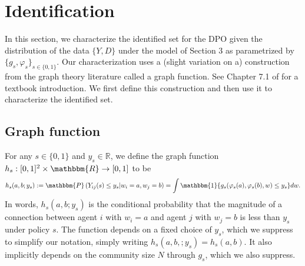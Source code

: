 \documentclass[12pt]{article}
\theoremstyle{definition}
\begin{document}


\section{Identification}
In this section, we characterize the identified set for the DPO given the distribution of the data $\{Y,D\}$ under the model of Section 3 as parametrized by $\{g_s,\varphi_s\}_{s \in \{0,1\}}$. Our characterization uses a (slight variation on a) construction from the graph theory literature called a graph function. See Chapter 7.1 of \cite{lovasz2012large} for a textbook introduction. We first define this construction and then use it to characterize the identified set. 

\subsection{Graph function}
For any $s \in \{0,1\}$ and $y_s \in \mathbb{R}$, we define the graph function $h_{s}: [0,1]^2\times \mathbbm{R} \to [0,1]$ to be
\begin{align*}
h_{s}(a,b; y_s) := \mathbbm{P}\left(Y_{ij}(s) \leq y_s| w_{i} = a, w_{j} = b\right) = \int \mathbbm{1}\{g_{s}(\varphi_s(a),\varphi_s(b),w) \leq y_s\}dw.
\end{align*}
In words, $h_{s}(a,b;y_s)$ is the conditional probability that the magnitude of a connection between agent $i$ with $w_i = a$ and agent $j$ with  $w_j = b$ is less than $y_s$ under policy $s$. The function depends on a fixed choice of  $y_s$, which we suppress to simplify our notation, simply writing $h_s(a,b,;y_s) = h_s(a,b)$. It also implicitly depends on the community size $N$ through $g_s$, which we also suppress.   
\end{document}
